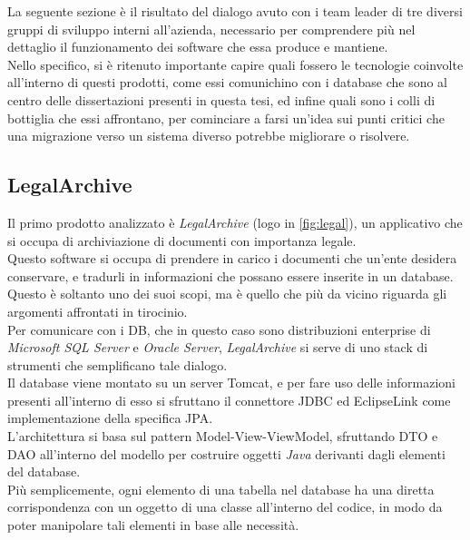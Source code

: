 La seguente sezione è il risultato del dialogo avuto con i team leader di tre diversi gruppi di sviluppo interni all'azienda, necessario per comprendere più nel dettaglio il funzionamento dei software che essa produce e mantiene.\\
Nello specifico, si è ritenuto importante capire quali fossero le tecnologie coinvolte all'interno di questi prodotti, come essi comunichino con i database che sono al centro delle dissertazioni presenti in questa tesi, ed infine quali sono i colli di bottiglia che essi affrontano, per cominciare a farsi un'idea sui punti critici che una migrazione verso un sistema diverso potrebbe migliorare o risolvere.\\

\subsection{LegalArchive}
Il primo prodotto analizzato è \textit{LegalArchive} (logo in \autoref{fig:legal}), un applicativo che si occupa di archiviazione di documenti con importanza legale\cite{site:legalarchive}.\\
Questo software si occupa di prendere in carico i documenti che un'ente desidera conservare, e tradurli in informazioni che possano essere inserite in un database.\\
Questo è soltanto uno dei suoi scopi, ma è quello che più da vicino riguarda gli argomenti affrontati in tirocinio.\\
Per comunicare con i DB, che in questo caso sono distribuzioni enterprise di \textit{Microsoft SQL Server} e \textit{Oracle Server}, \textit{LegalArchive} si serve di uno stack di strumenti che semplificano tale dialogo.\\
Il database viene montato su un server \gls{Tomcat}, e per fare uso delle informazioni presenti all'interno di esso si sfruttano il connettore \gls{JDBC} ed \gls{EclipseLink} come implementazione della specifica \gls{JPA}.\\
L'architettura si basa sul pattern \gls{Model-View-ViewModel}, sfruttando \gls{DTO} e \gls{DAO} all'interno del modello per costruire oggetti \textit{Java} derivanti dagli elementi del database.\\
Più semplicemente, ogni elemento di una tabella nel database ha una diretta corrispondenza con un oggetto di una classe all'interno del codice, in modo da poter manipolare tali elementi in base alle necessità.\\
